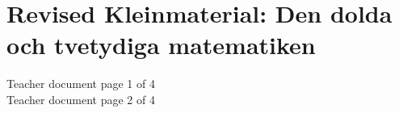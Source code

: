 \section{Revised Kleinmaterial: Den dolda och tvetydiga matematiken}
\label{app:case2}
Teacher document page 1 of 4\\
\newpage
Teacher document page 2 of 4\\
